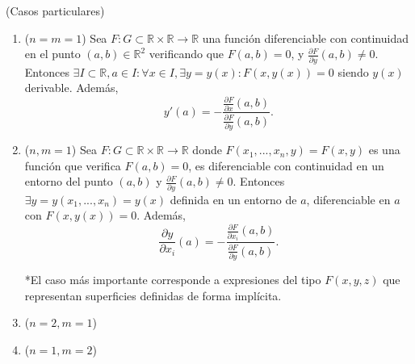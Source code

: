 \begin{obs}(Casos particulares)\\
\begin{enumerate}[label=(\roman*)]
    \item ($n = m = 1$) Sea $F:G\subset\mathbb{R}\times\mathbb{R}\rightarrow\mathbb{R}$ una función diferenciable con continuidad en el punto $(a,b)\in\mathbb{R}^2$ verificando que $F(a,b) = 0$, y $\frac{\partial F}{\partial y}(a,b) \neq 0$. Entonces $\exists I\subset\mathbb{R}, a\in I: \forall x \in I, \exists y = y(x): F(x,y(x)) = 0$ siendo $y(x)$ derivable. Además, \[ y'(a) = -\frac{\frac{\partial F}{\partial x}(a,b)}{\frac{\partial F}{\partial y}(a,b)} .\]
    
    \item ($n,m=1$) Sea $F:G\subset\mathbb{R}\times\mathbb{R}\rightarrow\mathbb{R}$ donde $F(x_1,...,x_n,y) = F(x,y)$ es una función que verifica $F(a,b) = 0$, es diferenciable con continuidad en un entorno del punto $(a,b)$ y $\frac{\partial F}{\partial y}(a,b) \neq 0$. Entonces $\exists y = y(x_1,...,x_n) = y(x)$ definida en un entorno de $a$, diferenciable en $a$ con $F(x,y(x)) = 0$. Además, \[ \frac{\partial y}{\partial x_i}(a) = -\frac{\frac{\partial F}{\partial x_i}(a,b)}{\frac{\partial F}{\partial y}(a,b)} .\]
    
    *El caso más importante corresponde a expresiones del tipo $F(x,y,z)$ que representan superficies definidas de forma implícita.
    
    \item ($n = 2 , m = 1$)
    \item ($n = 1 , m = 2$)
\end{enumerate}
\end{obs}
